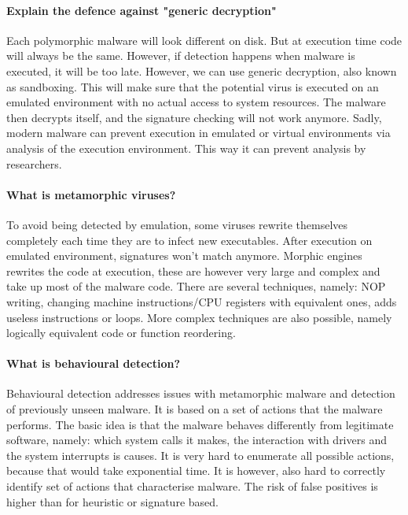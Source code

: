 \paragraph{Explain the defence against "generic decryption"}
Each polymorphic malware will look different on disk. But at execution time code will always be the same. However, if detection happens when malware is executed, it will be too late. However, we can use generic decryption, also known as sandboxing. This will make sure that the potential virus is executed on an emulated environment with no actual access to system resources. The malware then decrypts itself, and the signature checking will not work anymore. Sadly, modern malware can prevent execution in emulated or virtual environments via analysis of the execution environment. This way it can prevent analysis by researchers.

\paragraph{What is metamorphic viruses?}
To avoid being detected by emulation, some viruses rewrite themselves completely each time they are to infect new executables. After execution on emulated environment, signatures won't match anymore. Morphic engines rewrites the code at execution, these are however very large and complex and take up most of the malware code. There are several techniques, namely: NOP writing, changing machine instructions/CPU registers with equivalent ones, adds useless instructions or loops. More complex techniques are also possible, namely logically equivalent code or function reordering.

\paragraph{What is behavioural detection?}
Behavioural detection addresses issues with metamorphic malware and detection of previously unseen malware. It is based on a set of actions that the malware performs. The basic idea is that the malware behaves differently from legitimate software, namely: which system calls it makes, the interaction with drivers and the system interrupts is causes. It is very hard to enumerate all possible actions, because that would take exponential time. It is however, also hard to correctly identify set of actions that characterise malware. The risk of false positives is higher than for heuristic or signature based.

